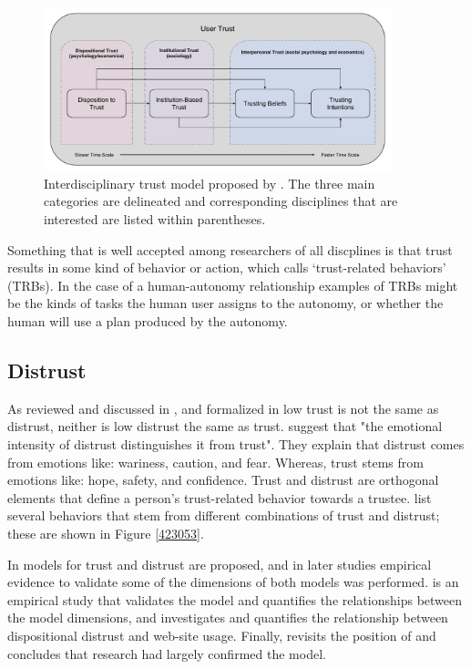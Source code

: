 	\begin{figure}[htbp]
    	\centering
     	\includegraphics[width=0.9\textwidth]{Figures/UserTrust}
    	\caption{Interdisciplinary trust model proposed by \citet{McKnight2001-fa}. The three main categories are delineated and corresponding disciplines that are interested are listed within parentheses.}
        \label{fig:UserTrust}
    \end{figure}

    Something that is well accepted among researchers of all discplines is that trust results in some kind of behavior or action, which \citet{McKnight2001-fa} calls `trust-related behaviors' (TRBs). In the case of a human-autonomy relationship examples of TRBs might be the kinds of tasks the human user assigns to the autonomy, or whether the human will use a plan produced by the autonomy.

    \subsection{Distrust}
        As reviewed and discussed in \cite{Lewicki1998-ox}, and formalized in \cite{McKnight2001-gz} low trust is not the same as distrust, neither is low distrust the same as trust. \citet{McKnight2001-gz} suggest that "the emotional intensity of distrust distinguishes it from trust". They explain that distrust comes from emotions like: wariness, caution, and fear. Whereas, trust stems from emotions like: hope, safety, and confidence. Trust and distrust are orthogonal elements that define a person's trust-related behavior towards a trustee. \citet{Lewicki1998-ox} list several behaviors that stem from different combinations of trust and distrust; these are shown in Figure \ref{423053}.

        In \cite{Harrison_McKnight2001-hm} models for trust and distrust are proposed, and in later studies empirical evidence to validate some of the dimensions of both models was performed. \citet{McKnight2002-qx} is an empirical study that validates the model and quantifies the relationships between the model dimensions, and \cite{Harrison_McKnight2004-vv} investigates and quantifies the relationship between dispositional distrust and web-site usage. Finally, \cite{McKnight2006-ce} revisits the position of \cite{McKnight1998-ty} and concludes that research had largely confirmed the model.

